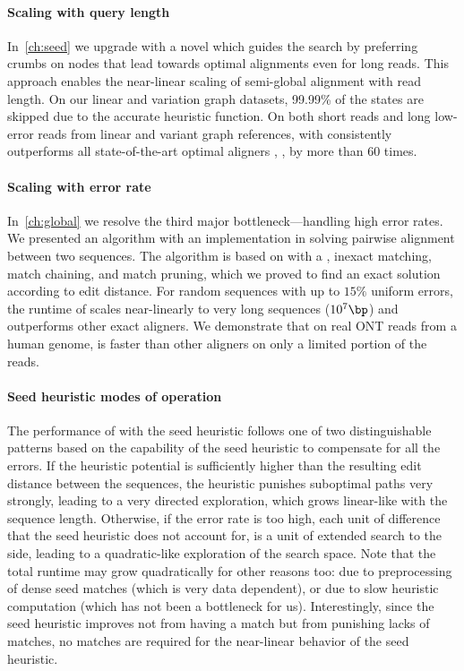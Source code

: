 \paragraph{Scaling with query length}
In~\cref{ch:seed} we upgrade \astarix with a novel \sh which guides the \A
search by preferring crumbs on nodes that lead towards optimal alignments even
for long reads. This approach enables the near-linear scaling of semi-global
alignment with read length. On our linear and variation graph datasets, 99.99\%
of the states are skipped due to the accurate heuristic function. On both short
reads and long low-error reads from linear and variant graph references, \A with
\sh consistently outperforms all state-of-the-art optimal aligners
\graphaligner, \vargas, \pasgal by more than 60 times.

\paragraph{Scaling with error rate}
In~\cref{ch:global} we resolve the third major bottleneck---handling high error
rates. We presented an algorithm with an implementation in \astarpa solving
pairwise alignment between two sequences. The algorithm is based on \A with a
\sh, inexact matching, match chaining, and match pruning, which we proved to
find an exact solution according to edit distance. For random sequences with up
to $15\%$ uniform errors, the runtime of \astarpa scales near-linearly to very
long sequences ($10^7\bp$) and outperforms other exact aligners. We demonstrate
that on real ONT reads from a human genome, \astarpa is faster than other
aligners on only a limited portion of the reads.

\paragraph{Seed heuristic modes of operation}
The performance of \A with the seed heuristic follows one of two distinguishable
patterns based on the capability of the seed heuristic to compensate for all the
errors. If the heuristic potential is sufficiently higher than the resulting
edit distance between the sequences, the heuristic punishes suboptimal paths
very strongly, leading to a very directed \A exploration, which grows
linear-like with the sequence length. Otherwise, if the error rate is too high,
each unit of difference that the seed heuristic does not account for, is a unit
of extended search to the side, leading to a quadratic-like exploration of the
search space. Note that the total runtime may grow quadratically for other
reasons too: due to preprocessing of dense seed matches (which is very data
dependent), or due to slow heuristic computation (which has not been a
bottleneck for us). Interestingly, since the seed heuristic improves not from
having a match but from punishing lacks of matches, no matches are required for
the near-linear behavior of the seed heuristic.

